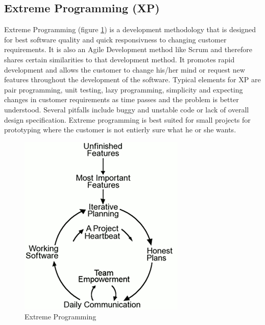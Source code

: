 \subsection{Extreme Programming (XP)}
Extreme Programming (figure \ref{fig:designmodel-xp}) is a development methodology that is designed for best software quality and
quick responsivness to changing customer requirements. It is also an Agile Development method like
Scrum and therefore shares certain similarities to that development method. It promotes rapid
development and allows the customer to change his/her mind or request new features throughout
the development of the software. Typical elements for XP are pair programming, unit testing,
lazy programming, simplicity and expecting changes in customer requirements as time passes
and the problem is better understood. Several pitfalls include buggy and unstable code or lack of
overall design specification. Extreme programming is best suited for small projects for prototyping
where the customer is not entierly sure what he or she wants.
\begin{figure}[h!]
\centering \includegraphics[scale=0.75]{img/designmodel-xp} \caption{Extreme Programming~\cite{link:xp}}
\label{fig:designmodel-xp}
\end{figure}

